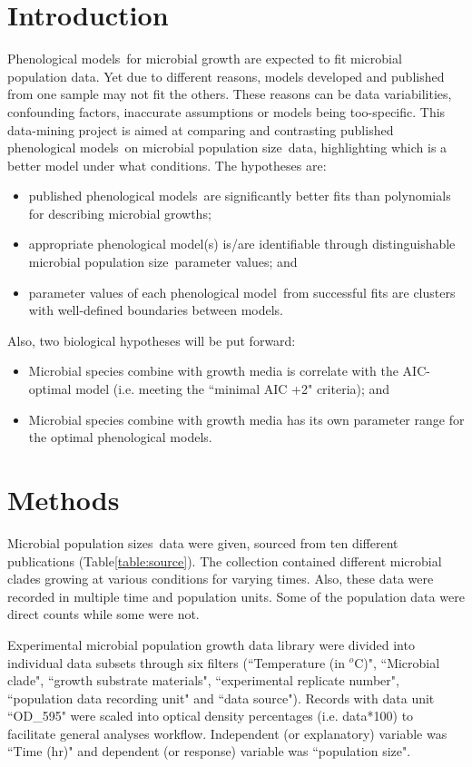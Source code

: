 \documentclass[a4paper, 11pt]{article}
\newcommand{\pml}{phenological model}
\newcommand{\pms}{phenological models}
\newcommand{\Pms}{Phenological models}
\newcommand{\pop}{population size}
\newcommand{\pps}{population sizes}
\begin{document}
	\section*{Introduction}
	\Pms\ for microbial growth are expected to fit microbial population data.  Yet due to different reasons, models developed and published from one sample may not fit the others.  These reasons can be data variabilities, confounding factors, inaccurate assumptions or models being too-specific.  This data-mining project is aimed at comparing and contrasting published \pms\ on microbial \pop\ data, highlighting which is a better model under what conditions.  The hypotheses are:
	\begin{itemize}
		\item published \pms\ are significantly better fits than polynomials for describing microbial growths;
		\item appropriate \pml(s) is/are identifiable through distinguishable microbial \pop\ parameter values; and
		\item parameter values of each \pml\ from successful fits are clusters with well-defined boundaries between models.
	\end{itemize}
	Also, two biological hypotheses will be put forward:
	\begin{itemize}
		\item Microbial species combine with growth media is correlate with the AIC-optimal model (i.e. meeting the ``minimal AIC +2"\autocite{burnham2004multimodel} criteria); and
		\item Microbial species combine with growth media has its own parameter range for the optimal \pms.
	\end{itemize}
	
	\section*{Methods}
	
	Microbial \pps\ data were given, sourced from ten different publications (Table\ref{table:source}).  The collection contained different microbial clades growing at various conditions for varying times.  Also, these data were recorded in multiple time and population units.  Some of the population data were direct counts while some were not.
	
	Experimental microbial population growth data library were divided into individual data subsets through six filters (``Temperature (in $^o$C)", ``Microbial clade", ``growth substrate materials", ``experimental replicate number", ``population data recording unit" and ``data source").  Records with data unit ``OD\_595" were scaled into optical density percentages (i.e. data*100) to facilitate general analyses workflow.  Independent (or explanatory) variable was ``Time (hr)" and dependent (or response) variable was ``\pop".
	
\end{document}
